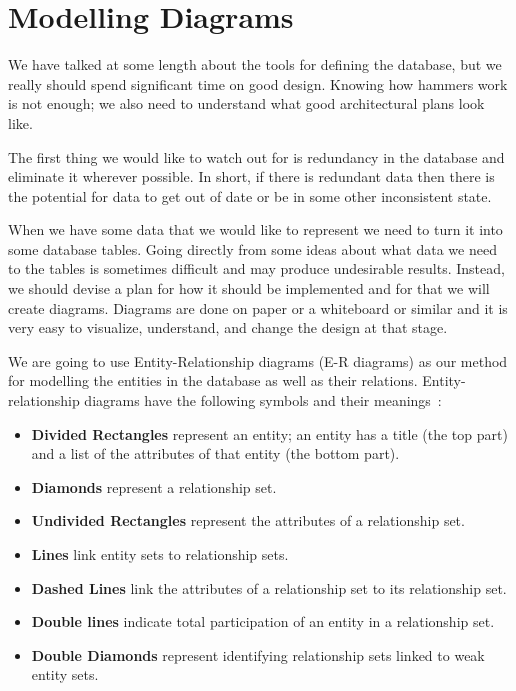 




\section*{Modelling Diagrams}

We have talked at some length about the tools for defining the database, but we really should spend significant time on good design. Knowing how hammers work is not enough; we also need to understand what good architectural plans look like.

The first thing we would like to watch out for is redundancy in the database and eliminate it wherever possible. In short, if there is redundant data then there is the potential for data to get out of date or be in some other inconsistent state. 

When we have some data that we would like to represent we need to turn it into some database tables. Going directly from some ideas about what data we need to the tables is sometimes difficult and may produce undesirable results. Instead, we should devise a plan for how it should be implemented and for that we will create diagrams. Diagrams are done on paper or a whiteboard or similar and it is very easy to visualize, understand, and change the design at that stage.

We are going to use Entity-Relationship diagrams (E-R diagrams) as our method for modelling the entities in the database as well as their relations. Entity-relationship diagrams have the following symbols and their meanings~\cite{dsc}:

\begin{itemize}
	\item \textbf{Divided Rectangles} represent an entity; an entity has a title (the top part) and a list of the attributes of that entity (the bottom part).
	\item \textbf{Diamonds} represent a relationship set.
	\item \textbf{Undivided Rectangles} represent the attributes of a relationship set. 
	\item \textbf{Lines} link entity sets to relationship sets.
	\item \textbf{Dashed Lines} link the attributes of a relationship set to its relationship set.
	\item \textbf{Double lines} indicate total participation of an entity in a relationship set.
	\item \textbf{Double Diamonds} represent identifying relationship sets linked to weak entity sets.
\end{itemize}

